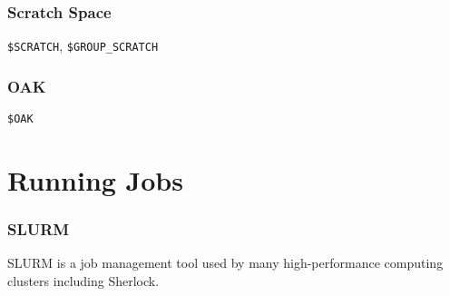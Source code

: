 \documentclass[aspectratio=169]{beamer}
\begin{document}
\begin{frame}[t]
	\frametitle{Scratch Space}
		\texttt{\$SCRATCH}, \texttt{\$GROUP\_SCRATCH}
\end{frame}

\begin{frame}[t]
	\frametitle{OAK}
		\texttt{\$OAK}
\end{frame}


\section{Running Jobs}

\frame{\sectionpage}

\begin{frame}[t]
	\frametitle{SLURM}
		SLURM is a job management tool used by many high-performance computing clusters including Sherlock.
\end{frame}
\end{document}
